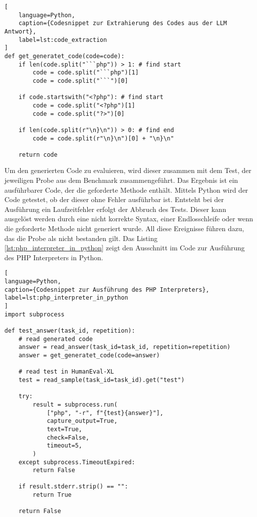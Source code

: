 \begin{lstlisting}[
	language=Python,
	caption={Codesnippet zur Extrahierung des Codes aus der LLM Antwort},
	label=lst:code_extraction
]
def get_generatet_code(code=code):
    if len(code.split("```php")) > 1: # find start
        code = code.split("```php")[1]
        code = code.split("```")[0]

    if code.startswith("<?php"): # find start
        code = code.split("<?php")[1]
        code = code.split("?>")[0]

    if len(code.split(r"\n}\n")) > 0: # find end
        code = code.split(r"\n}\n")[0] + "\n}\n"

    return code
\end{lstlisting}

Um den generierten Code zu evaluieren, wird dieser zusammen mit dem Test, der jeweiligen Probe aus dem Benchmark zusammengeführt. Das Ergebnis ist ein ausführbarer Code, der die geforderte Methode enthält. Mittels Python wird der Code getestet, ob der dieser ohne Fehler ausführbar ist. Entsteht bei der Ausführung ein Laufzeitfehler erfolgt der Abbruch des Tests. Dieser kann ausgelöst werden durch eine nicht korrekte Syntax, einer Endlosschleife oder wenn die geforderte Methode nicht generiert wurde. All diese Ereignisse führen dazu, das die Probe als nicht bestanden gilt. Das Listing \ref{lst:php_interpreter_in_python} zeigt den Ausschnitt im Code zur Ausführung des PHP Interpreters in Python.\vspace{0.2cm}

\begin{lstlisting}[
language=Python,
caption={Codesnippet zur Ausführung des PHP Interpreters},
label=lst:php_interpreter_in_python
]
import subprocess

def test_answer(task_id, repetition):
    # read generated code
    answer = read_answer(task_id=task_id, repetition=repetition)
    answer = get_generatet_code(code=answer)

    # read test in HumanEval-XL
    test = read_sample(task_id=task_id).get("test")

    try:
        result = subprocess.run(
            ["php", "-r", f"{test}{answer}"],
            capture_output=True,
            text=True,
            check=False,
            timeout=5,
        )
    except subprocess.TimeoutExpired:
        return False

    if result.stderr.strip() == "":
        return True

    return False
\end{lstlisting}

